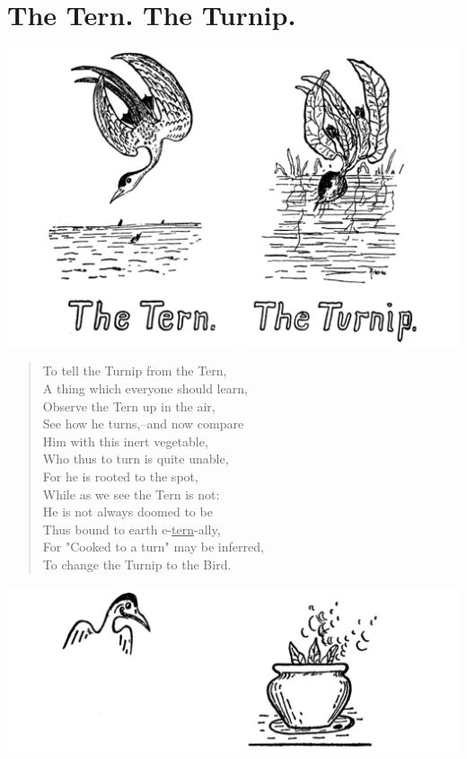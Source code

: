 \documentclass[letterpaper, 10pt, openany]{memoir}
\begin{document}
\chapter{The Tern. The Turnip.}
\includegraphics[width=1\textwidth]{f-p12.png}
\vspace{\onelineskip}
\begin{verse}\huge
To tell the Turnip from the Tern,\\
A thing which everyone should learn,\\
Observe the Tern up in the air,\\
See how he turns,--and now compare\\
Him with this inert vegetable,\\
Who thus to turn is quite unable,\\
For he is rooted to the spot,\\
\newpage
While as we see the Tern is not:\\
He is not always doomed to be\\
Thus bound to earth e-\underline{tern}-ally,\\
For "Cooked to a turn" may be inferred,\\
To change the Turnip to the Bird.\\
\end{verse}

\vspace{\onelineskip}
\vspace{\onelineskip}
\includegraphics[width=1\textwidth]{f-p13.png}\\
\vspace{\onelineskip}
\vspace{\onelineskip}
\end{document}
